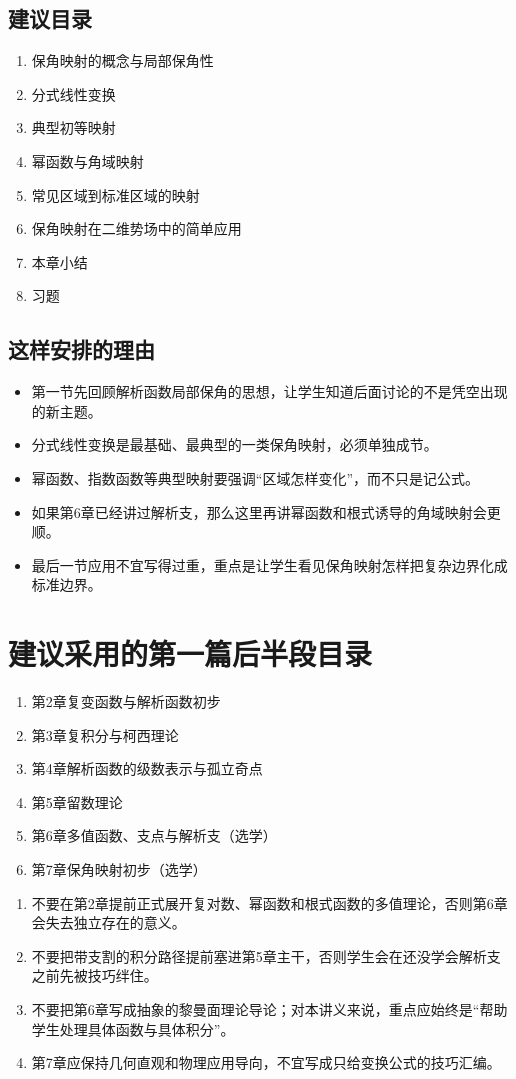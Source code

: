 \subsection*{建议目录}
\begin{enumerate}
    \item 保角映射的概念与局部保角性
    \item 分式线性变换
    \item 典型初等映射
    \item 幂函数与角域映射
    \item 常见区域到标准区域的映射
    \item 保角映射在二维势场中的简单应用
    \item 本章小结
    \item 习题
\end{enumerate}

\subsection*{这样安排的理由}
\begin{itemize}
    \item 第一节先回顾解析函数局部保角的思想，让学生知道后面讨论的不是凭空出现的新主题。
    \item 分式线性变换是最基础、最典型的一类保角映射，必须单独成节。
    \item 幂函数、指数函数等典型映射要强调``区域怎样变化''，而不只是记公式。
    \item 如果第6章已经讲过解析支，那么这里再讲幂函数和根式诱导的角域映射会更顺。
    \item 最后一节应用不宜写得过重，重点是让学生看见保角映射怎样把复杂边界化成标准边界。
\end{itemize}

\section*{建议采用的第一篇后半段目录}

\begin{tishi}[推荐目录总表]
\begin{enumerate}
    \item 第2章\quad 复变函数与解析函数初步
    \item 第3章\quad 复积分与柯西理论
    \item 第4章\quad 解析函数的级数表示与孤立奇点
    \item 第5章\quad 留数理论
    \item 第6章\quad 多值函数、支点与解析支（选学）
    \item 第7章\quad 保角映射初步（选学）
\end{enumerate}
\end{tishi}

\begin{jinshi}[编排时需要特别注意的地方]
\begin{enumerate}
    \item 不要在第2章提前正式展开复对数、幂函数和根式函数的多值理论，否则第6章会失去独立存在的意义。
    \item 不要把带支割的积分路径提前塞进第5章主干，否则学生会在还没学会解析支之前先被技巧绊住。
    \item 不要把第6章写成抽象的黎曼面理论导论；对本讲义来说，重点应始终是``帮助学生处理具体函数与具体积分''。
    \item 第7章应保持几何直观和物理应用导向，不宜写成只给变换公式的技巧汇编。
\end{enumerate}
\end{jinshi}
